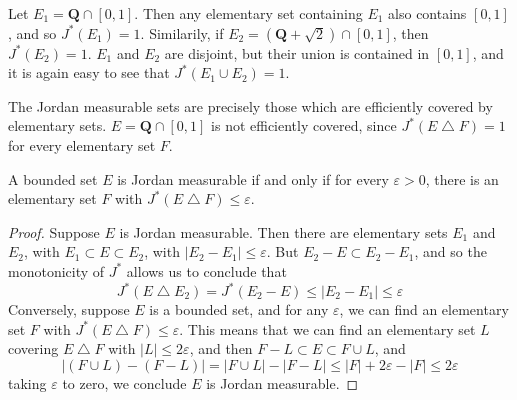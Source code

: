 \begin{example}
  Let $E_1 = \mathbf{Q} \cap [0,1]$. Then any elementary set containing $E_1$ also contains $[0,1]$, and so $J^*(E_1) = 1$. Similarily, if $E_2 = (\mathbf{Q} + \sqrt{2}) \cap [0,1]$, then $J^*(E_2) = 1$. $E_1$ and $E_2$ are disjoint, but their union is contained in $[0,1]$, and it is again easy to see that $J^*(E_1 \cup E_2) = 1$.
\end{example}

The Jordan measurable sets are precisely those which are efficiently covered by elementary sets. $E = \mathbf{Q} \cap [0,1]$ is not efficiently covered, since $J^*(E \bigtriangleup F) = 1$ for every elementary set $F$.

\begin{theorem}
    A bounded set $E$ is Jordan measurable if and only if for every $\varepsilon > 0$, there is an elementary set $F$ with $J^*(E \bigtriangleup F) \leq \varepsilon$.
\end{theorem}
\begin{proof}
  Suppose $E$ is Jordan measurable. Then there are elementary sets $E_1$ and $E_2$, with $E_1 \subset E \subset E_2$, with $|E_2 - E_1| \leq \varepsilon$. But $E_2 - E \subset E_2 - E_1$, and so the monotonicity of $J^*$ allows us to conclude that
  \[ J^*(E \bigtriangleup E_2) = J^*(E_2 - E) \leq |E_2 - E_1| \leq \varepsilon \]
  Conversely, suppose $E$ is a bounded set, and for any $\varepsilon$, we can find an elementary set $F$ with $J^*(E \bigtriangleup F) \leq \varepsilon$. This means that we can find an elementary set $L$ covering $E \bigtriangleup F$ with $|L| \leq 2\varepsilon$, and then $F - L \subset E \subset F \cup L$, and
  \[ |(F \cup L) - (F - L)| = |F \cup L| - |F - L| \leq |F| + 2\varepsilon - |F| \leq 2\varepsilon \]
  taking $\varepsilon$ to zero, we conclude $E$ is Jordan measurable.
\end{proof}

